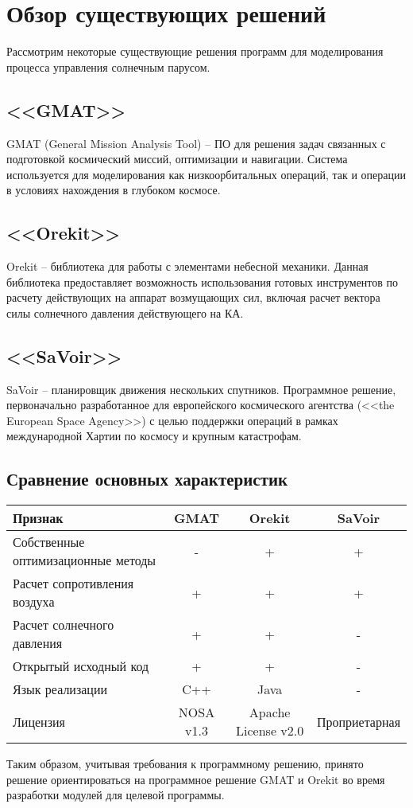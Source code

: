 \chapter{Обзор существующих решений}
\noindent\indent Рассмотрим некоторые существующие решения программ для моделирования
процесса управления солнечным парусом.
\section{<<GMAT>>}
\noindent\indent GMAT (General Mission Analysis Tool) -- ПО для решения задач связанных
с подготовкой космический миссий, оптимизации и навигации. Система используется для
моделирования как низкоорбитальных операций, так и операции в условиях нахождения
в глубоком космосе.
\section{<<Orekit>>}
\noindent\indent Orekit -- библиотека для работы с элементами небесной механики.
Данная библиотека предоставляет возможность использования готовых инструментов по расчету
действующих на аппарат возмущающих сил, включая расчет вектора силы солнечного давления
действующего на КА.
\section{<<SaVoir>>}
\noindent\indent SaVoir -- планировщик движения нескольких спутников. Программное
решение, первоначально разработанное для европейского космического агентства
(<<the European Space Agency>>) с целью поддержки операций в рамках международной
Хартии по космосу и крупным катастрофам.
\section{Сравнение основных характеристик}
\begin{tabular}{|l|c|c|c|}
  \hline
  Признак                            & GMAT                            & Orekit              & SaVoir \\ \hline
  Собственные оптимизационные методы & -                               & +                   & +      \\ \hline
  Расчет сопротивления воздуха       & +                               & +                   & +      \\ \hline
  Расчет солнечного давления         & +                               & +                   & -      \\ \hline
  Открытый исходный код              & +                               & +                   & -      \\ \hline
  Язык реализации                    & C++                             & Java                & -      \\ \hline
  Лицензия                           & NOSA v1.3                       & Apache License v2.0 & Проприетарная \\ \hline
\end{tabular}\par
Таким образом, учитывая требования к программному решению, принято решение
ориентироваться на программное решение GMAT и Orekit во время разработки модулей
для целевой программы.
